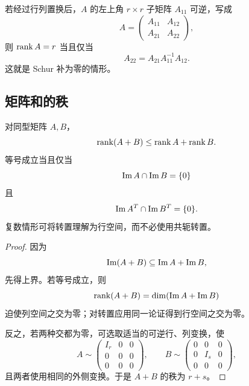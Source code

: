 \begin{remark}
若经过行列置换后，$A$ 的左上角 $r\times r$ 子矩阵 $A_{11}$ 可逆，写成
\begin{equation}
 A=\begin{pmatrix}
 A_{11}&A_{12}\\
 A_{21}&A_{22}
 \end{pmatrix},
\end{equation}
则 $\operatorname{rank} A=r$ 当且仅当
\begin{equation}
 A_{22}=A_{21}A_{11}^{-1}A_{12}.
\end{equation}
这就是 Schur 补为零的情形。
\end{remark}

\subsection{矩阵和的秩}

\begin{theorem}
对同型矩阵 $A,B$，
\begin{equation}
 \operatorname{rank}(A+B)\leq\operatorname{rank} A+\operatorname{rank} B.
\end{equation}
等号成立当且仅当
\begin{equation}
 \operatorname{Im} A\cap\operatorname{Im} B=\{0\}
\end{equation}
且
\begin{equation}
 \operatorname{Im} A^T\cap\operatorname{Im} B^T=\{0\}.
\end{equation}
复数情形可将转置理解为行空间，而不必使用共轭转置。
\end{theorem}

\begin{proof}
因为
\begin{equation}
 \operatorname{Im}(A+B)\subseteq\operatorname{Im} A+\operatorname{Im} B,
\end{equation}
先得上界。若等号成立，则
\begin{equation}
 \operatorname{rank}(A+B)=\dim(\operatorname{Im} A+\operatorname{Im} B)
\end{equation}
迫使列空间之交为零；对转置应用同一论证得到行空间之交为零。

反之，若两种交都为零，可选取适当的可逆行、列变换，使
\begin{equation}
 A\sim
 \begin{pmatrix}
 I_r&0&0\\
 0&0&0\\
 0&0&0
 \end{pmatrix},
 \qquad
 B\sim
 \begin{pmatrix}
 0&0&0\\
 0&I_s&0\\
 0&0&0
 \end{pmatrix},
\end{equation}
且两者使用相同的外侧变换。于是 $A+B$ 的秩为 $r+s$。
\end{proof}

